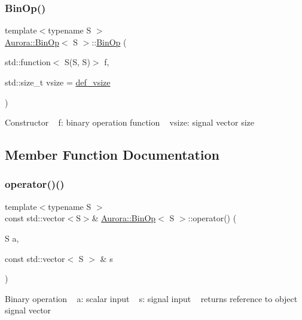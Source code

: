 \subsubsection{\texorpdfstring{Bin\+Op()}{BinOp()}}
{\footnotesize\ttfamily template$<$typename S $>$ \\
\hyperlink{class_aurora_1_1_bin_op}{Aurora\+::\+Bin\+Op}$<$ S $>$\+::\hyperlink{class_aurora_1_1_bin_op}{Bin\+Op} (\begin{DoxyParamCaption}\item[{std\+::function$<$ S(S, S)$>$}]{f,  }\item[{std\+::size\+\_\+t}]{vsize = {\ttfamily \hyperlink{namespace_aurora_afaaddf667a06e7ce23c667a8b7295263}{def\+\_\+vsize}} }\end{DoxyParamCaption})\hspace{0.3cm}{\ttfamily [inline]}}

Constructor ~\newline
f\+: binary operation function ~\newline
vsize\+: signal vector size 

\subsection{Member Function Documentation}
\mbox{\label{class_aurora_1_1_bin_op_aef7a0a9a5daa40c22e540f08ca928fab}} 
\subsubsection{\texorpdfstring{operator()()}{operator()()}\hspace{0.1cm}{\footnotesize\ttfamily [1/3]}}
{\footnotesize\ttfamily template$<$typename S $>$ \\
const std\+::vector$<$S$>$\& \hyperlink{class_aurora_1_1_bin_op}{Aurora\+::\+Bin\+Op}$<$ S $>$\+::operator() (\begin{DoxyParamCaption}\item[{S}]{a,  }\item[{const std\+::vector$<$ S $>$ \&}]{s }\end{DoxyParamCaption})\hspace{0.3cm}{\ttfamily [inline]}}

Binary operation ~\newline
a\+: scalar input ~\newline
s\+: signal input ~\newline
returns reference to object signal vector \mbox{\label{class_aurora_1_1_bin_op_a488095df0eb9f16da6643476dec9e51c}} 
